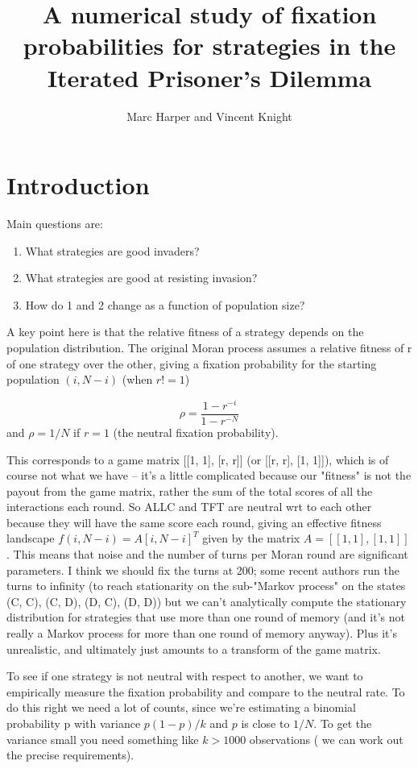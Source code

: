 \documentclass{article}
\title{A numerical study of fixation probabilities for strategies in the
Iterated Prisoner's Dilemma}
\author{Marc Harper and Vincent Knight}
\date{}
\begin{document}
\maketitle


\section{Introduction}\label{sec:introduction}

Main questions are:

\begin{enumerate}
    \item What strategies are good invaders?
    \item What strategies are good at resisting invasion?
    \item How do 1 and 2 change as a function of population size?
\end{enumerate}

A key point here is that the relative fitness of a strategy depends on the population distribution. The original Moran process assumes a relative fitness of r of one strategy over the other, giving a fixation probability for the starting population $(i, N-i)$ (when $r != 1$)

\[ \rho = \frac{1 - r^{-i}}{1 - r^{-N}}\]
and $\rho = 1 / N$ if $r=1$ (the neutral fixation probability).

This corresponds to a game matrix [[1, 1], [r, r]] (or [[r, r], [1, 1]]), which is of course not what we have -- it's a little complicated because our "fitness" is not the payout from the game matrix, rather the sum of the total scores of all the interactions each round. So ALLC and TFT are neutral wrt to each other because they will have the same score each round, giving an effective fitness landscape $f(i, N-i) = A [i, N-i]^T$ given by the matrix $A = [[1,1],[1,1]]$. This means that noise and the number of turns per Moran round are significant parameters. I think we should fix the turns at 200; some recent authors run the turns to infinity (to reach stationarity on the sub-"Markov process" on the states (C, C), (C, D), (D, C), (D, D)) but we can't analytically compute the stationary distribution for strategies that use more than one round of memory (and it's not really a Markov process for more than one round of memory anyway). Plus it's unrealistic, and ultimately just amounts to a transform of the game matrix.

To see if one strategy is not neutral with respect to another, we want to empirically measure the fixation probability and compare to the neutral rate. To do this right we need a lot of counts, since we're estimating a binomial probability p with variance $p(1-p) / k$ and $p$ is close to $1 / N$. To get the variance small you need something like $k>1000$ observations ( we can work out the precise requirements).
\end{document}
